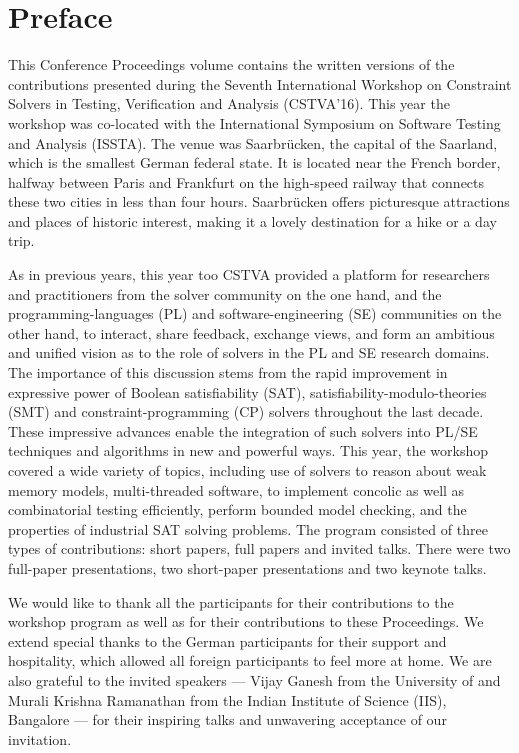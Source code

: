 \section*{Preface}

This Conference Proceedings volume contains the written versions of the
contributions presented during the Seventh International Workshop on Constraint
Solvers in Testing, Verification and Analysis (CSTVA'16). This year the
workshop was co-located with the International Symposium on Software Testing
and Analysis (ISSTA). The venue was Saarbr{\"u}cken, the capital of the
Saarland, which is the smallest German federal state. It is located near the
French border, halfway between Paris and Frankfurt on the high-speed railway
that connects these two cities in less than four hours. Saarbr{\"u}cken offers
picturesque attractions and places of historic interest, making it a lovely
destination for a hike or a day trip.  

As in previous years, this year too CSTVA provided a platform for researchers
and practitioners from the solver community on the one hand, and the
programming-languages (PL) and software-engineering (SE) communities on the
other hand, to interact, share feedback, exchange views, and form an ambitious
and unified vision as to the role of solvers in the PL and SE research
domains. The importance of this discussion stems from the rapid improvement in
expressive power of Boolean satisfiability (SAT),
satisfiability-modulo-theories (SMT) and constraint-programming (CP) solvers
throughout the last decade. These impressive advances enable the integration of
such solvers into PL/SE techniques and algorithms in new and powerful ways.
This year, the workshop covered a wide variety of topics, including use of
solvers to reason about weak memory models, multi-threaded software, to
implement concolic as well as combinatorial testing efficiently, perform
bounded model checking, and the properties of industrial SAT solving problems.
The program consisted of three types of contributions: short papers, full
papers and invited talks. There were two full-paper presentations, two
short-paper presentations and two keynote talks. 

We would like to thank all the participants for their contributions to the
workshop program as well as for their contributions to these Proceedings. We
extend special thanks to the German participants for their support and
hospitality, which allowed all foreign participants to feel more at home. We
are also grateful to the invited speakers --- Vijay Ganesh from the University
of and Murali Krishna Ramanathan from the Indian Institute of Science (IIS),
Bangalore --- for their inspiring talks and unwavering acceptance of our
invitation.

